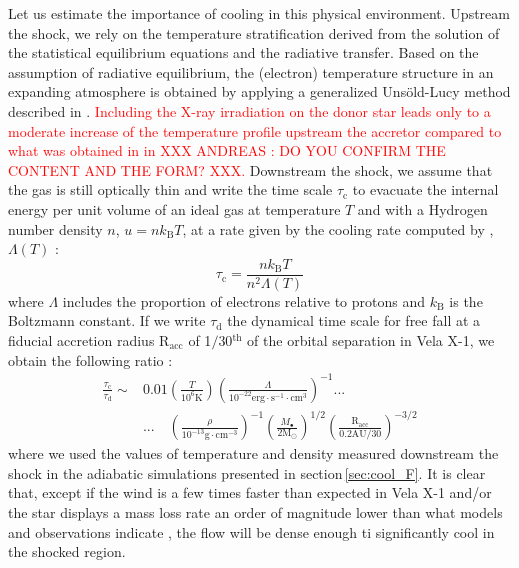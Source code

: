 \documentclass{aa}
\begin{document}
Let us estimate the importance of cooling in this physical environment. Upstream the shock, we rely on the temperature stratification derived from the solution of the statistical equilibrium equations and the radiative transfer. Based on the assumption of radiative equilibrium, the (electron) temperature structure in an expanding atmosphere is obtained by applying a generalized Uns{\"o}ld-Lucy method described in \citet{Hamann1998}. \textcolor{red}{Including the X-ray irradiation on the donor star leads only to a moderate increase of the temperature profile upstream the accretor compared to what was obtained in in \cite{Sander2017} XXX ANDREAS : DO YOU CONFIRM THE CONTENT AND THE FORM? XXX.} Downstream the shock, we assume that the gas is still optically thin and write the time scale $\tau_{\text{c}}$ to evacuate the internal energy per unit volume of an ideal gas at temperature $T$ and with a Hydrogen number density $n$, $u=nk_{\text{B}}T$, at a rate given by the cooling rate computed by \cite{Schure2009}, $\Lambda\left(T\right)$ :
\begin{equation}
\tau_{\text{c}}=\frac{nk_{\text{B}}T}{n^2\Lambda\left(T\right)}
\end{equation}
where $\Lambda$ includes the proportion of electrons relative to protons and $k_{\text{B}}$ is the Boltzmann constant. If we write $\tau_{\text{d}}$ the dynamical time scale for free fall at a fiducial accretion radius R$_{\text{acc}}$ of 1$/$30$^{\text{th}}$ of the orbital separation in Vela X-1, we obtain the following ratio :
\begin{align}
\frac{\tau_{\text{c}}}{\tau_{\text{d}}}\sim & 0.01\left(\frac{T}{10^6\text{K}}\right)\left(\frac{\Lambda}{10^{-22}\text{erg}\cdot\text{s}^{-1}\cdot\text{cm}^{3}}\right)^{-1} \text{...}\\
&  \text{...} \quad \left(\frac{\rho}{10^{-13}\text{g}\cdot\text{cm}^{-3}}\right)^{-1}\left(\frac{M_{\bullet}}{2\text{M}_{\odot}}\right)^{1/2}\left(\frac{\text{R}_{\text{acc}}}{0.2\text{AU}/30}\right)^{-3/2}
\end{align}
where we used the values of temperature and density measured downstream the shock in the adiabatic simulations presented in section\,\ref{sec:cool_F}. It is clear that, except if the wind is a few times faster than expected in Vela X-1 and/or the star displays a mass loss rate an order of magnitude lower than what models and observations indicate \cite[$\sim$1.3$\cdot 10^{-6}$M$_{\odot}\cdot$yr$^{-1}$,][]{Gimenez-Garcia2016}, the flow will be dense enough ti significantly cool in the shocked region.
\end{document}
